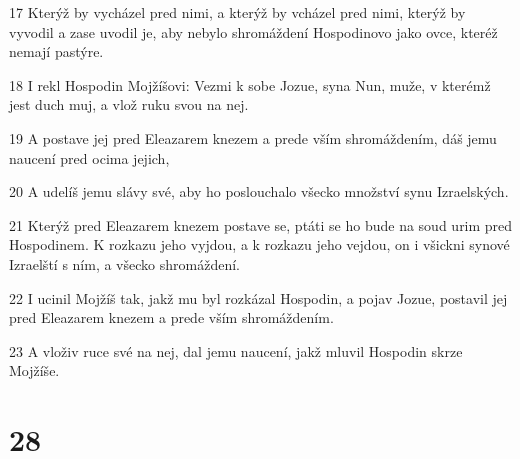 \par 17 Kterýž by vycházel pred nimi, a kterýž by vcházel pred nimi, kterýž by vyvodil a zase uvodil je, aby nebylo shromáždení Hospodinovo jako ovce, kteréž nemají pastýre.
\par 18 I rekl Hospodin Mojžíšovi: Vezmi k sobe Jozue, syna Nun, muže, v kterémž jest duch muj, a vlož ruku svou na nej.
\par 19 A postave jej pred Eleazarem knezem a prede vším shromáždením, dáš jemu naucení pred ocima jejich,
\par 20 A udelíš jemu slávy své, aby ho poslouchalo všecko množství synu Izraelských.
\par 21 Kterýž pred Eleazarem knezem postave se, ptáti se ho bude na soud urim pred Hospodinem. K rozkazu jeho vyjdou, a k rozkazu jeho vejdou, on i všickni synové Izraelští s ním, a všecko shromáždení.
\par 22 I ucinil Mojžíš tak, jakž mu byl rozkázal Hospodin, a pojav Jozue, postavil jej pred Eleazarem knezem a prede vším shromáždením.
\par 23 A vloživ ruce své na nej, dal jemu naucení, jakž mluvil Hospodin skrze Mojžíše.

\chapter{28}

